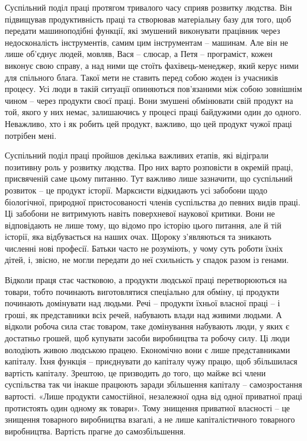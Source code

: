 \documentclass[../main]{subfiles}
\begin{document}
Суспільний поділ праці протягом тривалого часу сприяв розвитку людства. Він підвищував продуктивність праці та створював матеріальну базу для того, щоб передати машиноподібні функції, які змушений виконувати працівник через недосконалість інструментів, самим цим інструментам – машинам. Але він не лише об’єднує людей, мовляв, Вася – слюсар, а Петя – програміст, кожен виконує свою справу, а над ними ще стоїть фахівець-менеджер, який керує ними для спільного блага. Такої мети не ставить перед собою жоден із учасників процесу. Усі люди в такій ситуації опиняються пов’язаними між собою зовнішнім чином – через продукти своєї праці. Вони змушені обмінювати свій продукт на той, якого у них немає, залишаючись у процесі праці байдужими один до одного. Неважливо, хто і як робить цей продукт, важливо, що цей продукт чужої праці потрібен мені.

Суспільний поділ праці пройшов декілька важливих етапів, які відіграли позитивну роль у розвитку людства. Про них варто розповісти в окремій праці, присвяченій саме цьому питанню. Тут важливо лише зазначити, що суспільний розвиток – це продукт історії. Марксисти відкидають усі забобони щодо біологічної, природної пристосованості членів суспільства до певних видів праці. Ці забобони не витримують навіть поверхневої наукової критики. Вони не відповідають не лише тому, що відомо про історію цього питання, але й тій історії, яка відбувається на наших очах. Щороку з’являються та зникають численні нові професії. Батьки часто не розуміють, у чому суть роботи їхніх дітей, і, звісно, не могли передати до неї схильність у спадок разом із генами.

Відколи праця стає частковою, а продукти людської праці перетворюються на товари, тобто починають виготовлятися спеціально для обміну, ці продукти починають домінувати над людьми. Речі – продукти їхньої власної праці – і гроші, як представники всіх речей, набувають влади над живими людьми. А відколи робоча сила стає товаром, таке домінування набувають люди, у яких є достатньо грошей, щоб купувати засоби виробництва та робочу силу. Ці люди володіють живою людською працею. Економічно вони є лише представниками капіталу. Їхня функція – приєднувати до капіталу чужу працю, щоб збільшилася вартість капіталу. Зрештою, це призводить до того, що майже всі члени суспільства так чи інакше працюють заради збільшення капіталу – самозростання вартості. «Лише продукти самостійної, незалежної одна від одної приватної праці протистоять один одному як товари». Тому знищення приватної власності – це знищення товарного виробництва взагалі, а не лише капіталістичного товарного виробництва. Вартість прагне до самозбільшення.
\end{document}
